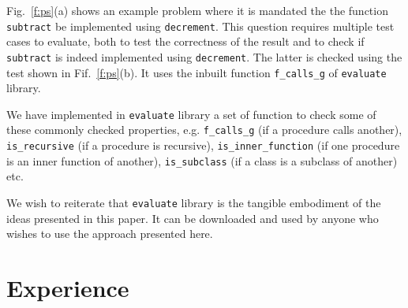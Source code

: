 \documentclass[sigconf]{acmart}
\begin{document}
Fig.~\ref{f:ps}(a) shows an example problem where it is mandated the the function \lstinline[style=pc]|subtract| be implemented using \lstinline[style=pc]|decrement|. This question requires multiple test cases to evaluate, both to test the correctness of the result and to check if \lstinline[style=pc]|subtract| is indeed implemented using \lstinline[style=pc]|decrement|. The latter is checked using the test shown in Fif.~\ref{f:ps}(b). It uses the inbuilt function \lstinline[style=pc]|f_calls_g| of \lstinline[style=pc]|evaluate| library.

We have implemented in \lstinline[style=pc]|evaluate| library a set of function to check some of these commonly checked properties, e.g. \lstinline[style=pc]|f_calls_g| (if a procedure calls another), \lstinline[style=pc]|is_recursive| (if a procedure is recursive), \lstinline[style=pc]|is_inner_function| (if one procedure is an inner function of another), \lstinline[style=pc]|is_subclass| (if a class is a subclass of another) etc.

We wish to reiterate that \lstinline[style=pc]|evaluate| library is the tangible embodiment of the ideas presented in this paper. It can be downloaded and used by anyone who wishes to use the approach presented here.

\section{Experience}
\end{document}
